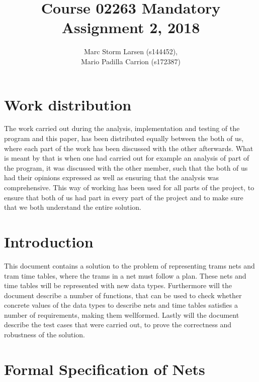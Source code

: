 \documentclass[a4]{article}
\title{Course 02263 Mandatory Assignment 2, 2018}
\author{Marc Storm Larsen (s144452),\\ 
        Mario Padilla Carrion (s172387)}
\begin{document}
\maketitle

\tableofcontents
\newpage

\section{Work distribution}
The work carried out during the analysis, implementation and testing of the program and this paper, has been distributed equally between the both of us, where each part of the work has been discussed with the other afterwards. What is meant by that is when one had carried out for example an analysis of part of the program, it was discussed with the other member, such that the both of us had their opinions expressed as well as ensuring that the analysis was comprehensive. This way of working has been used for all parts of the project, to ensure that both of us had part in every part of the project and to make sure that we both understand the entire solution.

\section{Introduction}
This document contains a solution to the problem of representing trams nets and tram time tables, where the trams in a net must follow a plan. These nets and time tables will be represented with new data types. Furthermore will the document describe a number of functions, that can be used to check whether concrete values of the data types to describe nets and time tables satisfies a number of requirements, making them wellformed. Lastly will the document describe the test cases that were carried out, to prove the correctness and robustness of the solution.

\section{Formal Specification of Nets}


\end{document}
